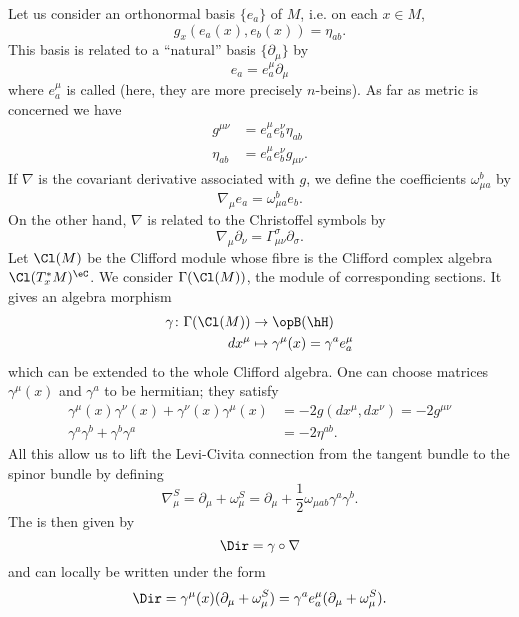 Let us consider an orthonormal basis $\{ e_a \}$ of $M$, i.e. on each $x\in M$, 
\[ 
  g_x(e_a(x),e_b(x))=\eta_{ab}.
\]
This basis is related to a ``natural'' basis $\{ \partial_{\mu} \}$ by
\begin{equation} 
  e_a=e_a^{\mu}\partial_{\mu}
\end{equation}
where  $e_a^{\mu}$ is called  (here, they are more precisely $n$-beins). As far as metric is concerned we have
\begin{subequations}
\begin{align}
	g^{\mu\nu}&=e_a^{\mu}e_b^{\nu}\eta_{ab}\\
	\eta_{ab}&=e_a^{\mu}e_b^{\nu}g_{\mu\nu}.
\end{align}
\end{subequations}
If $\nabla$ is the covariant derivative associated with $g$, we define the coefficients $\omega_{\mu a}^b$ by
\begin{equation}
\nabla_{\mu}e_a=\omega_{\mu a}^be_b.
\end{equation}
On the other hand, $\nabla$ is related to the Christoffel symbols by
\begin{equation}
\nabla_{\mu}\partial_{\nu}=\Gamma_{\mu\nu}^{\sigma}\partial_{\sigma}.
\end{equation}
Let $\Cl(M)$ be the Clifford module whose fibre is the Clifford complex algebra $\Cl(T^*_xM)^{\eC}$. We consider $\Gamma(\Cl(M))$, the module of corresponding sections. It gives an algebra morphism
\begin{equation}
\begin{aligned}
 \gamma\colon\Gamma(\Cl(M))&\to \opB(\hH) \\ 
dx^{\mu}&\mapsto \gamma^{\mu}(x)=\gamma^ae_a^{\mu} 
\end{aligned}
\end{equation}
which can be extended to the whole Clifford algebra. One can choose matrices $\gamma^{\mu}(x)$ and $\gamma^a$ to be hermitian; they satisfy
\begin{subequations}
\begin{align}
\gamma^{\mu}(x)\gamma^{\nu}(x)+\gamma^{\nu}(x)\gamma^{\mu}(x)&=-2g(dx^{\mu},dx^{\nu})=-2g^{\mu\nu}\\
\gamma^a\gamma^b+\gamma^b\gamma^a&=-2\eta^{ab}.
\end{align}
\end{subequations}
All this allow us to lift the Levi-Civita connection from the tangent bundle to the spinor bundle by defining
\begin{equation}
\nabla_{\mu}^S=\partial_{\mu}+\omega^S_{\mu}=\partial_{\mu}+\frac{ 1 }{2}\omega_{\mu ab}\gamma^a\gamma^b.
\end{equation}
The  is then given by
\[ 
  \Dir=\gamma\circ\nabla
\]
and can locally be written under the form
\begin{equation}  \label{eq_Dirac_deux}
\Dir=\gamma^{\mu}(x)(\partial_{\mu}+\omega_{\mu}^S)
	=\gamma^ae_a^{\mu}(\partial_{\mu}+\omega^S_{\mu}).
\end{equation}
